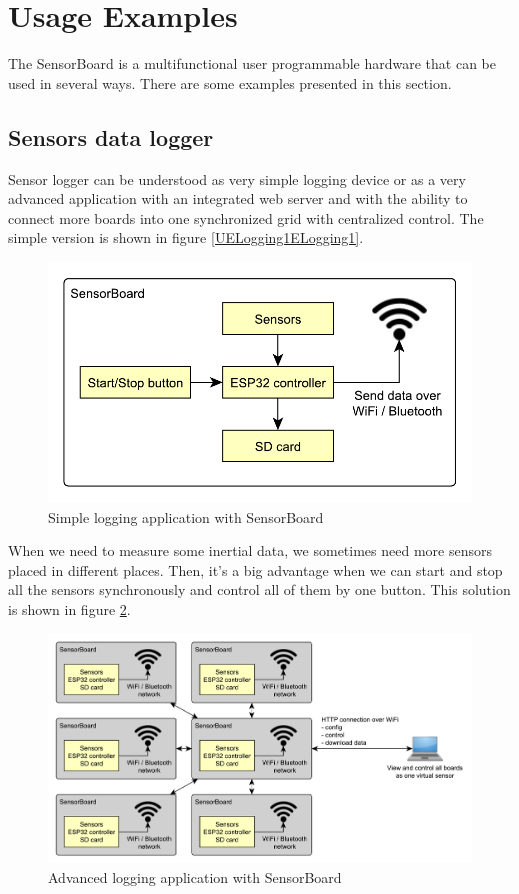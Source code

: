 \section{Usage Examples}
The SensorBoard is a multifunctional user programmable hardware that can be used in several ways. There are some examples presented in this section.

\subsection{Sensors data logger}
\label{ExampleLogger}
Sensor logger can be understood as very simple logging device or as a very advanced application with an integrated web server and with the ability to connect more boards into one synchronized grid with centralized control. The simple version is shown in figure \ref{UELogging1ELogging1}.

\begin{figure}
	\centering
	\label{UELogging1}
	\caption{Simple logging application with SensorBoard}
	\includegraphics[scale=1]{img/UsageExamplesLogger1.pdf}
\end{figure}

When we need to measure some inertial data, we sometimes need more sensors placed in different places. Then, it's a big advantage when we can start and stop all the sensors synchronously and control all of them by one button. This solution is shown in figure \ref{UELogging2}.

\begin{figure}
	\centering
	\label{UELogging2}
	\caption{Advanced logging application with SensorBoard}
	\includegraphics[width=\linewidth]{img/UsageExamplesLogger2.pdf}
\end{figure}

